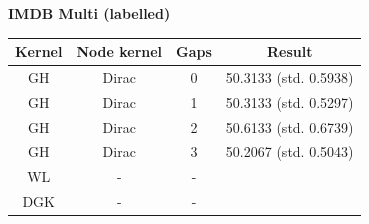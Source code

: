 \documentclass{article}
\begin{document}
\textbf{IMDB Multi (labelled)}\\
\begin{minipage}{0.6\linewidth}
	\hspace*{-1in}

	\label{fig:imdb_multi_labelled}
\end{minipage}
\begin{minipage}[c]{0.5\linewidth}	
	\centering
	\begin{tabular}{c|c|c|c}
		Kernel & Node kernel & Gaps & Result\\
		\hline
		GH & Dirac & 0 & 50.3133 (std. 0.5938) \\
		GH & Dirac & 1 & 50.3133 (std. 0.5297) \\
		GH & Dirac & 2 & 50.6133 (std. 0.6739) \\
		GH & Dirac & 3 & 50.2067 (std. 0.5043) \\
		WL & - & - & \\
		DGK & - & - & \\
	\end{tabular}
	\label{table:imdb_multi_labelled}
\end{minipage}
\end{document}
